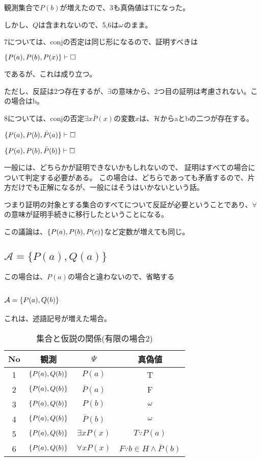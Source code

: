 \documentclass[10pt, oneside]{jarticle}   	%
\begin{document}
観測集合で$P(b)$が増えたので、3も真偽値はTになった。

しかし、$Q$は含まれないので、5,6は$\omega$のまま。

7については、conjの否定は同じ形になるので、証明すべきは

$\{{P(a), P(b), P(x)}\} \vdash \Box$ 

であるが、これは成り立つ。

ただし、反証は2つ存在するが、$\exists$の意味から、2つ目の証明は考慮されない。この場合はb。

8については、conjの否定$\exists x \bar P(x)$の変数$x$は、$\mathcal{H}$からaとbの二つが存在する。

$\{P(a), P(b), \bar P(a)\} \vdash \Box$

$\{P(a), P(b), \bar P(b)\} \vdash \Box$

一般には、どちらかが証明できないかもしれないので、
証明はすべての場合について判定する必要がある。
この場合は、どちらであっても矛盾するので、片方だけでも正解になるが、一般にはそうはいかないという話。


つまり証明の対象とする集合のすべてについて反証が必要ということであり、$\forall$の意味が証明手続きに移行したということになる。

この議論は、$\{{P(a), P(b), P(c)}\}$など定数が増えても同じ。
\subsection{$\mathcal{A}=\{P(a), Q(a)\}$}
この場合は、$P(a)$の場合と違わないので、省略する

\subsection{$\mathcal{A}=\{{P(a), Q(b)}\}$}
これは、述語記号が増えた場合。

\begin{table}[htbp]
 \centering
 \begin{tabular}{|c|c|c|c|}\hline
   No & 観測 & $\Psi$ & 真偽値 \\ \hline
   1 & $\{{P(a), Q(b)}\}$ & $P(a)$ & T \\ \hline
   2 & $\{{P(a), Q(b)}\}$ & $\bar P(a)$ & F \\ \hline
   3 & $\{{P(a), Q(b)}\}$ & $P(b)$ & $\omega$ \\ \hline
   4 & $\{{P(a), Q(b)}\}$ & $\bar P(b)$ & $\omega$ \\ \hline
   5 & $\{{P(a), Q(b)}\}$& $\exists x P(x)$ & $T \because P(a)$ \\ \hline
   6 & $\{{P(a), Q(b)}\}$ & $\forall x P(x)$ & $F \because b \in H \land \bar P(b)$ \\ \hline
 \end{tabular}
 \caption{集合と仮説の関係(有限の場合2)}
 \label{tab:ex0103}
\end{table}
\end{document}
